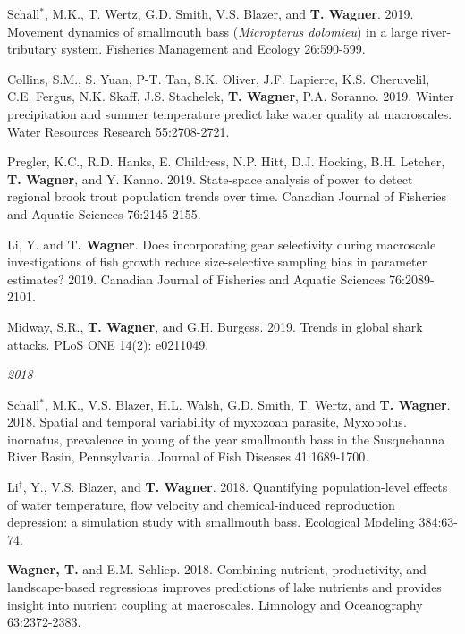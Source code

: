 \documentclass[10pt]{article}
\begin{document}
\begin{flushleft}
\begin{etaremune}[start=91]
\item Schall$^*$, M.K., T. Wertz, G.D. Smith, V.S. Blazer, and \textbf{T. Wagner}. 2019. Movement dynamics of smallmouth bass (\textit{Micropterus dolomieu}) in a large river-tributary system. Fisheries Management and Ecology 26:590-599.	

\item Collins, S.M., S. Yuan, P-T. Tan, S.K. Oliver, J.F. Lapierre, K.S. Cheruvelil, C.E. Fergus, N.K. Skaff, J.S. Stachelek, \textbf{T. Wagner}, P.A. Soranno. 2019. Winter precipitation and summer temperature predict lake water quality at macroscales. Water Resources Research 55:2708-2721.
	
\item Pregler, K.C., R.D. Hanks, E. Childress, N.P. Hitt, D.J. Hocking, B.H. Letcher, \textbf{T. Wagner}, and Y. Kanno. 2019. State-space analysis of power to detect regional brook trout population trends over time. Canadian Journal of Fisheries and Aquatic Sciences 76:2145-2155.

\item Li, Y. and \textbf{T. Wagner}. Does incorporating gear selectivity during macroscale investigations of fish growth reduce size-selective sampling bias in parameter estimates? 2019. Canadian Journal of Fisheries and Aquatic Sciences 76:2089-2101.

\item Midway, S.R., \textbf{T. Wagner}, and G.H. Burgess. 2019. Trends in global shark attacks. PLoS ONE
14(2): e0211049.

\end{etaremune}

\emph{2018}
\begin{etaremune}[start=81]
\item Schall$^*$, M.K., V.S. Blazer, H.L. Walsh, G.D. Smith, T. Wertz, and \textbf{T. Wagner}. 2018. Spatial and temporal variability of myxozoan parasite, Myxobolus. inornatus, prevalence in young of the year smallmouth bass in the Susquehanna River Basin, Pennsylvania. Journal of Fish Diseases 41:1689-1700.

\item Li$^\dagger$, Y., V.S. Blazer, and \textbf{T. Wagner}. 2018. Quantifying population-level effects of water temperature, flow velocity and chemical-induced reproduction depression: a simulation study with smallmouth bass. Ecological Modeling 384:63-74.

\item {\bf Wagner, T.} and E.M. Schliep. 2018. Combining nutrient, productivity, and landscape-based regressions improves predictions of lake nutrients and provides insight into nutrient coupling at macroscales. Limnology and Oceanography 63:2372-2383.


\end{etaremune}
\end{flushleft}
\end{document}
